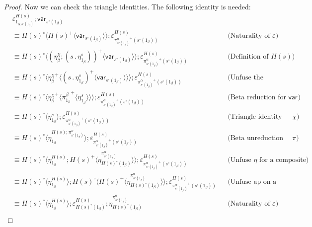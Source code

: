 \documentclass[10pt]{article}
\theoremstyle{definition}
\newcommand\TrPlus[2]{\ensuremath{{#1}^+(#2)}}
\newcommand\TrCirc[2]{\ensuremath{{#1}^\circ(#2)}}
\newcommand\var[1]{\ensuremath{\mathsf{var}_{#1}}}
\newcommand\ApPlus[2]{\ensuremath{{#1}^+ \langle #2 \rangle }}
\newcommand\ApCirc[2]{\ensuremath{{#1}^\circ \langle #2 \rangle }}
\newcommand\bdot[0]{\mathbin{.}}
\begin{document}
\begin{proof}
Now we can check the triangle identities. The following identity is needed:
\begin{align*}
&\varepsilon^{{H(s)}}_{1_{\alpha.\TrCirc{{s}}{1_\beta}}}; \var{\TrCirc{{s}}{1_\beta}} \\
&\equiv \ApCirc{H(s)}{\ApPlus{H(s)}{\var{\TrCirc{{s}}{1_\beta}}}} ; \varepsilon^{H(s)}_{\TrPlus{\pi^\alpha_{\TrCirc{s}{1_\beta}}}{\TrCirc{s}{1_\beta}}} 
&&\text{(Naturality of $\varepsilon$)} \\
&\equiv \ApCirc{H(s)}{\ApPlus{(\eta^\chi_\beta ; (s \bdot \eta^{s}_{1_\beta}))}{\var{\TrCirc{{s}}{1_\beta}}}} ; \varepsilon^{H(s)}_{\TrPlus{\pi^\alpha_{\TrCirc{s}{1_\beta}}}{\TrCirc{s}{1_\beta}}}
&&\text{(Definition of $H(s)$)} \\
&\equiv \ApCirc{H(s)}{\ApPlus{\eta^\chi_\beta}{\ApPlus{(s \bdot \eta^{s}_{1_\beta})}{\var{\TrCirc{{s}}{1_\beta}}}}} ; \varepsilon^{H(s)}_{\TrPlus{\pi^\alpha_{\TrCirc{s}{1_\beta}}}{\TrCirc{s}{1_\beta}}} 
&&\text{(Unfuse the transport)} \\
&\equiv \ApCirc{H(s)}{\ApPlus{\eta^\chi_\beta}{\ApPlus{\pi^\beta_{1_\beta}}{\eta^{s}_{1_\beta}}}} ; \varepsilon^{H(s)}_{\TrPlus{\pi^\alpha_{\TrCirc{s}{1_\beta}}}{\TrCirc{s}{1_\beta}}}
&&\text{(Beta reduction for $\var{}$)} \\
&\equiv \ApCirc{H(s)}{\eta^{s}_{1_\beta}} ; \varepsilon^{H(s)}_{\TrPlus{\pi^\alpha_{\TrCirc{s}{1_\beta}}}{\TrCirc{s}{1_\beta}}}
&&\text{(Triangle identity for $\chi$)} \\
&\equiv \ApCirc{H(s)}{\eta^{H(s);\pi^\alpha_{\TrCirc{s}{1_\beta}}}_{1_\beta}} ; \varepsilon^{H(s)}_{\TrPlus{\pi^\alpha_{\TrCirc{s}{1_\beta}}}{\TrCirc{s}{1_\beta}}}
&&\text{(Beta unreduction for $\pi$)} \\
&\equiv \ApCirc{H(s)}{\eta^{H(s)}_{1_\beta};\ApPlus{H(s)}{\eta^{\pi^\alpha_{\TrCirc{s}{1_\beta}}}_{\TrCirc{H(s)}{1_\beta}}}} ; \varepsilon^{H(s)}_{\TrPlus{\pi^\alpha_{\TrCirc{s}{1_\beta}}}{\TrCirc{s}{1_\beta}}}
&&\text{(Unfuse $\eta$ for a composite)} \\
&\equiv \ApCirc{H(s)}{\eta^{H(s)}_{1_\beta}};\ApCirc{H(s)}{\ApPlus{H(s)}{\eta^{\pi^\alpha_{\TrCirc{s}{1_\beta}}}_{\TrCirc{H(s)}{1_\beta}}}} ; \varepsilon^{H(s)}_{\TrPlus{\pi^\alpha_{\TrCirc{s}{1_\beta}}}{\TrCirc{s}{1_\beta}}}
&&\text{(Unfuse ap on a composite)} \\
&\equiv \ApCirc{H(s)}{\eta^{H(s)}_{1_\beta}} ; \varepsilon^{H(s)}_{\TrCirc{H(s)}{1_\beta}} ; \eta^{\pi^\alpha_{\TrCirc{s}{1_\beta}}}_{\TrCirc{H(s)}{1_\beta}}
&&\text{(Naturality of $\varepsilon$)} \\

\end{align*}
\end{proof}
\end{document}
